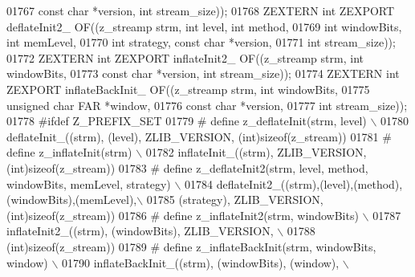 \begin{DoxyCode}
01767                                      \textcolor{keyword}{const} \textcolor{keywordtype}{char} *version, \textcolor{keywordtype}{int} stream\_size));
01768 ZEXTERN \textcolor{keywordtype}{int} ZEXPORT deflateInit2\_ OF((z\_streamp strm, \textcolor{keywordtype}{int}  level, \textcolor{keywordtype}{int}  method,
01769                                       \textcolor{keywordtype}{int} windowBits, \textcolor{keywordtype}{int} memLevel,
01770                                       \textcolor{keywordtype}{int} strategy, \textcolor{keyword}{const} \textcolor{keywordtype}{char} *version,
01771                                       \textcolor{keywordtype}{int} stream\_size));
01772 ZEXTERN \textcolor{keywordtype}{int} ZEXPORT inflateInit2\_ OF((z\_streamp strm, \textcolor{keywordtype}{int}  windowBits,
01773                                       \textcolor{keyword}{const} \textcolor{keywordtype}{char} *version, \textcolor{keywordtype}{int} stream\_size));
01774 ZEXTERN \textcolor{keywordtype}{int} ZEXPORT inflateBackInit\_ OF((z\_streamp strm, \textcolor{keywordtype}{int} windowBits,
01775                                          \textcolor{keywordtype}{unsigned} \textcolor{keywordtype}{char} FAR *window,
01776                                          \textcolor{keyword}{const} \textcolor{keywordtype}{char} *version,
01777                                          \textcolor{keywordtype}{int} stream\_size));
01778 \textcolor{preprocessor}{#ifdef Z\_PREFIX\_SET}
01779 \textcolor{preprocessor}{#  define z\_deflateInit(strm, level) \(\backslash\)}
01780 \textcolor{preprocessor}{          deflateInit\_((strm), (level), ZLIB\_VERSION, (int)sizeof(z\_stream))}
01781 \textcolor{preprocessor}{#  define z\_inflateInit(strm) \(\backslash\)}
01782 \textcolor{preprocessor}{          inflateInit\_((strm), ZLIB\_VERSION, (int)sizeof(z\_stream))}
01783 \textcolor{preprocessor}{#  define z\_deflateInit2(strm, level, method, windowBits, memLevel, strategy) \(\backslash\)}
01784 \textcolor{preprocessor}{          deflateInit2\_((strm),(level),(method),(windowBits),(memLevel),\(\backslash\)}
01785 \textcolor{preprocessor}{                        (strategy), ZLIB\_VERSION, (int)sizeof(z\_stream))}
01786 \textcolor{preprocessor}{#  define z\_inflateInit2(strm, windowBits) \(\backslash\)}
01787 \textcolor{preprocessor}{          inflateInit2\_((strm), (windowBits), ZLIB\_VERSION, \(\backslash\)}
01788 \textcolor{preprocessor}{                        (int)sizeof(z\_stream))}
01789 \textcolor{preprocessor}{#  define z\_inflateBackInit(strm, windowBits, window) \(\backslash\)}
01790 \textcolor{preprocessor}{          inflateBackInit\_((strm), (windowBits), (window), \(\backslash\)}

\end{DoxyCode}
